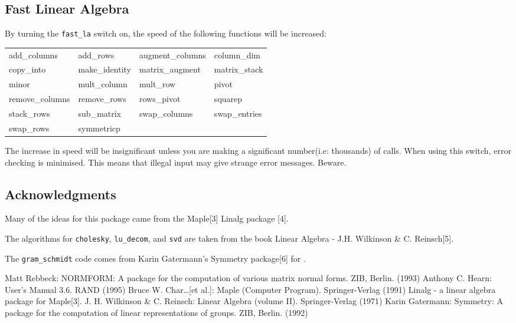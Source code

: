 \subsection{Fast Linear Algebra}

By turning the {\tt fast\_la} switch on, the speed of the following 
functions will be increased:

\begin{tabular}{l l l l}
   add\_columns    & add\_rows      & augment\_columns & column\_dim  \\
   copy\_into      & make\_identity & matrix\_augment  & matrix\_stack\\
   minor           & mult\_column   &  mult\_row       & pivot        \\
   remove\_columns & remove\_rows   & rows\_pivot      & squarep      \\
   stack\_rows     & sub\_matrix    & swap\_columns    & swap\_entries\\
   swap\_rows      & symmetricp                                     
\end{tabular}

The increase in speed will be insignificant unless you are making a 
significant number(i.e: thousands) of calls. When using this switch, 
error checking is minimised. This means that illegal input may give
strange error messages. Beware.

\newpage

\subsection{Acknowledgments}

Many of the ideas for this package came from the Maple[3] Linalg package
[4].

The algorithms for {\tt cholesky}, {\tt lu\_decom}, and {\tt svd} are 
taken from the book Linear Algebra - J.H. Wilkinson \& C. Reinsch[5].

The {\tt gram\_schmidt} code comes from Karin Gatermann's Symmetry 
package[6] for {\REDUCE}.


\begin{thebibliography}{}
 Matt Rebbeck: NORMFORM: A {\REDUCE} package for the 
computation of various matrix normal forms. ZIB, Berlin. (1993)
 Anthony C. Hearn: {\REDUCE} User's Manual 3.6.
	RAND (1995)
 Bruce W. Char\ldots [et al.]: Maple (Computer 
        Program). Springer-Verlag (1991)
 Linalg - a linear algebra package for Maple[3].
 J. H. Wilkinson \& C. Reinsch: Linear Algebra 
(volume II). Springer-Verlag (1971)
 Karin Gatermann: Symmetry: A {\REDUCE} package for the 
computation of linear representations of groups. ZIB, Berlin. (1992)
\end{thebibliography}
